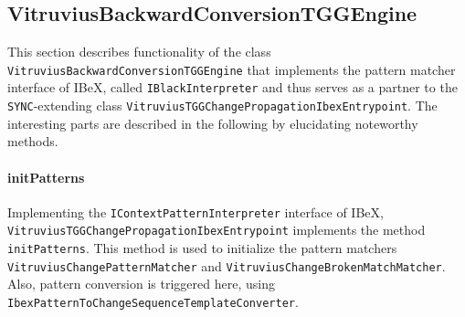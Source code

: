 \subsection{VitruviusBackwardConversionTGGEngine}
\label{sec:Implementation:PatternMatchingProcess:Engine}
This section describes functionality of the class \texttt{VitruviusBackwardConversionTGGEngine} that implements the pattern matcher interface of IBeX, called \texttt{IBlackInterpreter}
and thus serves as a partner to the \texttt{SYNC}-extending class \newline\texttt{VitruviusTGGChangePropagationIbexEntrypoint}.
The interesting parts are described in the following by elucidating noteworthy methods.

\paragraph{initPatterns} Implementing the \texttt{IContextPatternInterpreter} interface of IBeX, \newline\texttt{VitruviusTGGChangePropagationIbexEntrypoint} implements the method \texttt{initPatterns}.
This method is used to initialize the pattern matchers \texttt{VitruviusChangePatternMatcher} and \texttt{VitruviusChangeBrokenMatchMatcher}. Also, pattern conversion is triggered here, using \texttt{IbexPatternToChangeSequenceTemplateConverter}.


